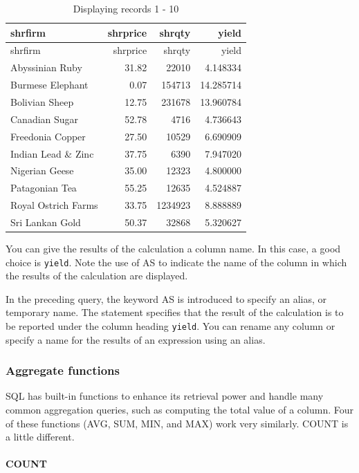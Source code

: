 \documentclass[
]{article}
\begin{document}
\begin{longtable}[]{@{}lrrr@{}}
\caption{Displaying records 1 - 10}\tabularnewline
\toprule()
shrfirm & shrprice & shrqty & yield \\
\midrule()
\endfirsthead
\toprule()
shrfirm & shrprice & shrqty & yield \\
\midrule()
\endhead
Abyssinian Ruby & 31.82 & 22010 & 4.148334 \\
Burmese Elephant & 0.07 & 154713 & 14.285714 \\
Bolivian Sheep & 12.75 & 231678 & 13.960784 \\
Canadian Sugar & 52.78 & 4716 & 4.736643 \\
Freedonia Copper & 27.50 & 10529 & 6.690909 \\
Indian Lead \& Zinc & 37.75 & 6390 & 7.947020 \\
Nigerian Geese & 35.00 & 12323 & 4.800000 \\
Patagonian Tea & 55.25 & 12635 & 4.524887 \\
Royal Ostrich Farms & 33.75 & 1234923 & 8.888889 \\
Sri Lankan Gold & 50.37 & 32868 & 5.320627 \\
\bottomrule()
\end{longtable}

You can give the results of the calculation a column name. In this case,
a good choice is \texttt{yield}. Note the use of AS to indicate the name
of the column in which the results of the calculation are displayed.

In the preceding query, the keyword AS is introduced to specify an
alias, or temporary name. The statement specifies that the result of the
calculation is to be reported under the column heading \texttt{yield}.
You can rename any column or specify a name for the results of an
expression using an alias.

\hypertarget{aggregate-functions}{%
\subsubsection{Aggregate functions}\label{aggregate-functions}}

SQL has built-in functions to enhance its retrieval power and handle
many common aggregation queries, such as computing the total value of a
column. Four of these functions (AVG, SUM, MIN, and MAX) work very
similarly. COUNT is a little different.

\hypertarget{count}{%
\paragraph{COUNT}\label{count}}
\end{document}

